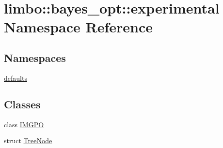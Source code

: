 \hypertarget{namespacelimbo_1_1bayes__opt_1_1experimental}{}\section{limbo\+:\+:bayes\+\_\+opt\+:\+:experimental Namespace Reference}
\label{namespacelimbo_1_1bayes__opt_1_1experimental}
\subsection*{Namespaces}
\begin{DoxyCompactItemize}
\item 
 \hyperlink{namespacelimbo_1_1bayes__opt_1_1experimental_1_1defaults}{defaults}
\end{DoxyCompactItemize}
\subsection*{Classes}
\begin{DoxyCompactItemize}
\item 
class \hyperlink{classlimbo_1_1bayes__opt_1_1experimental_1_1_i_m_g_p_o}{I\+M\+G\+PO}
\item 
struct \hyperlink{structlimbo_1_1bayes__opt_1_1experimental_1_1_tree_node}{Tree\+Node}
\end{DoxyCompactItemize}
